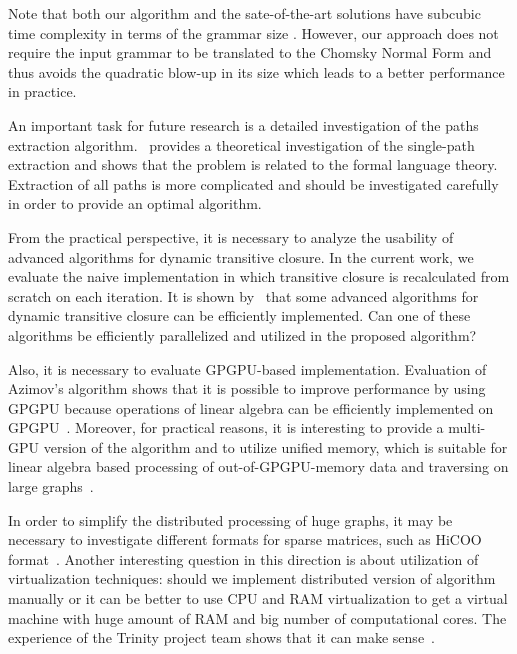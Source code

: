Note that both our algorithm and the sate-of-the-art solutions have subcubic time complexity in terms of the grammar size \citep{Azimov:2018:CPQ:3210259.3210264, hellingsRelational, hellingsPathQuerying, 10.1145/258994.259006, 10.1145/3398682.3399163}.
However, our approach does not require the input grammar to be translated to the Chomsky Normal Form and thus avoids the quadratic blow-up in its size which leads to a better performance in practice.


An important task for future research is a detailed investigation of the paths extraction algorithm.~\cite{HellSinglePath} provides a theoretical investigation of the single-path extraction and shows that the problem is related to the formal language theory.
Extraction of all paths is more complicated and should be investigated carefully in order to provide an optimal algorithm.


From the practical perspective, it is necessary to analyze the usability of advanced algorithms for dynamic transitive closure.
In the current work, we evaluate the naive implementation in which transitive closure is recalculated from scratch on each iteration.
It is shown by~\cite{cs6345} that some advanced algorithms for dynamic transitive closure can be efficiently implemented.
Can one of these algorithms be efficiently parallelized and utilized in the proposed algorithm?


Also, it is necessary to evaluate GPGPU-based implementation.
Evaluation of Azimov's algorithm shows that it is possible to improve performance by using GPGPU because operations of linear algebra can be efficiently implemented on GPGPU~\citep{Mishin:2019:ECP:3327964.3328503,10.1145/3398682.3399163}.
Moreover, for practical reasons, it is interesting to provide a multi-GPU version of the algorithm and to utilize unified memory, which is suitable for linear algebra based processing of out-of-GPGPU-memory data and traversing on large graphs~\citep{8946118,10.14778/3384345.3384358}.

In order to simplify the distributed processing of huge graphs, it may be necessary to investigate different formats for sparse matrices, such as HiCOO format~\citep{10.5555/3291656.3291682}.
Another interesting question in this direction is about utilization of virtualization techniques: should we implement distributed version of algorithm manually or it can be better to use CPU and RAM virtualization to get a virtual machine with huge amount of RAM and big number of computational cores.
The experience of the Trinity project team shows that it can make sense~\citep{10.1145/2463676.2467799}.

